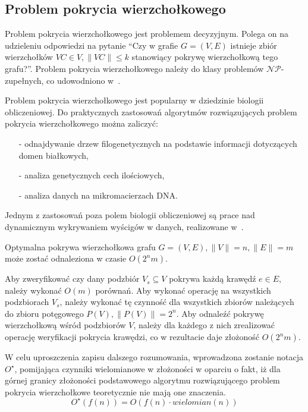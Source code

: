 \subsection{Problem pokrycia wierzchołkowego}\label{s_vertex_cover_domain}
\par{
  Problem pokrycia wierzchołkowego jest problemem decyzyjnym.
  Polega on na udzieleniu odpowiedzi na pytanie ``Czy w grafie $G=(V,E)$ istnieje 
  zbiór wierzchołków $VC \in V, \|VC\| \leq k$ stanowiący pokrywę wierzchołkową
  tego grafu?''.
  Problem pokrycia wierzchołkowego należy do klasy problemów 
  $\mathcal{NP}$-zupełnych, co udowodniono w~\cite{Kar72}.
}
\par{
  Problem pokrycia wierzchołkowego jest popularny w dziedzinie biologii
  obliczeniowej. 
  Do praktycznych zastosowań algorytmów rozwiązujących problem pokrycia
  wierzchołkowego można zaliczyć:
  \begin{itemize}
    \item[-] odnajdywanie drzew filogenetycznych na podstawie informacji
      dotyczących domen białkowych,
    \item[-] analiza genetycznych cech ilościowych,
    \item[-] analiza danych na mikromacierzach DNA.\@
  \end{itemize}

  Jednym z zastosowań poza polem biologii obliczeniowej są prace nad dynamicznym
  wykrywaniem wyścigów w danych, realizowane
  w~\cite{O'Callahan:2003:HDD:781498.781528}.
}
\begin{theorem}
  Optymalna pokrywa wierzchołkowa grafu $G=(V,E), \|V\|=n, \|E\|=m$ może zostać 
  odnaleziona w czasie $O(2^{n}m)$.
\end{theorem}
\begin{bproof}
  Aby zweryfikować czy dany podzbiór $V_s \subseteq V$ pokrywa każdą krawędź
  $e \in E$, należy wykonać $O(m)$ porównań.
  Aby wykonać operację na wszystkich podzbiorach $V_s$, należy wykonać tę
  czynność dla wszystkich zbiorów należących do zbioru potęgowego 
  $P(V), \|P(V)\| = 2^{n}$.
  Aby odnaleźć pokrywę wierzchołkową wśród podzbiorów $V$, należy dla każdego z
  nich zrealizować operację weryfikacji pokrycia krawędzi, co w rezultacie daje 
  złożoność $O(2^{n}m)$.
\end{bproof}

W celu uproszczenia zapisu dalszego rozumowania, wprowadzona zostanie notacja
$O^{\star}$, pomijająca czynniki wielomianowe w złożoności w oparciu o fakt, 
iż dla górnej granicy złożoności podstawowego algorytmu rozwiązującego problem 
pokrycia wierzchołkowe teoretycznie nie mają one znaczenia.
\begin{equation*}
  O^{\star}(f(n))=O(f(n) \cdot wielomian(n))
\end{equation*}

